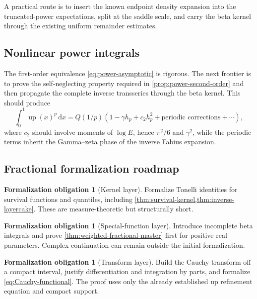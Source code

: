 \documentclass[11pt,oneside]{article}
\numberwithin{equation}{section}
\theoremstyle{definition}
\newtheorem{obligation}[theorem]{Formalization obligation}
\theoremstyle{remark}
\newcommand{\Up}{\operatorname{up}}
\newcommand{\dd}{\,\mathrm d}
\newcommand{\QF}{Q}
\begin{document}
A practical route is to insert the known endpoint density expansion into the
truncated-power expectations, split at the saddle scale, and carry the beta
kernel through the existing uniform remainder estimates.

\subsection{Nonlinear power integrals}

The first-order equivalence \eqref{eq:power-asymptotic} is rigorous.  The next
frontier is to prove the self-neglecting property required in
\cref{prop:power-second-order} and then propagate the complete inverse
transseries through the beta kernel.  This should produce
\begin{equation}
 \int_0^1\Up(x)^p\dd x
 =\QF(1/p)\left(1-\gamma h_p+c_2h_p^2+\text{periodic corrections}+\cdots\right),
 \label{eq:power-full-frontier}
\end{equation}
where \(c_2\) should involve moments of \(\log E\), hence \(\pi^2/6\) and
\(\gamma^2\), while the periodic terms inherit the Gamma--zeta phase of the
inverse Fabius expansion.

\subsection{Fractional formalization roadmap}

\begin{obligation}[Kernel layer]
Formalize Tonelli identities for survival functions and quantiles, including
\cref{thm:survival-kernel,thm:inverse-layercake}.  These are measure-theoretic
but structurally short.
\end{obligation}

\begin{obligation}[Special-function layer]
Introduce incomplete beta integrals and prove
\cref{thm:weighted-fractional-master} first for positive real parameters.
Complex continuation can remain outside the initial formalization.
\end{obligation}

\begin{obligation}[Transform layer]
Build the Cauchy transform off a compact interval, justify differentiation and
integration by parts, and formalize \eqref{eq:Cauchy-functional}.  The proof
uses only the already established up refinement equation and compact support.
\end{obligation}
\end{document}
